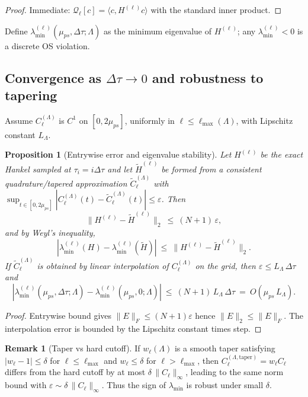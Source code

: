 \documentclass[10pt]{article}
\theoremstyle{definition}
\newtheorem{remark}{Remark}[section]
\theoremstyle{plain}
\newtheorem{proposition}{Proposition}[section]
\begin{document}
\begin{proof}
Immediate: $\mathcal Q_\ell[c]=\langle c, H^{(\ell)} c\rangle$ with the standard inner product.
\end{proof}

Define $\lambda_{\min}^{(\ell)}(\mu_{ps},\Delta\tau;\Lambda)$ as the minimum eigenvalue of $H^{(\ell)}$; any $\lambda_{\min}^{(\ell)}<0$ is a discrete OS violation.

\subsection{\texorpdfstring{Convergence as $\Delta\tau\to 0$ and robustness to tapering}{Convergence as Delta tau -> 0 and robustness to tapering}}\label{subsec:uom-main-009}
Assume $C_\ell^{(\Lambda)}$ is $C^1$ on $[0,2\mu_{ps}]$, uniformly in $\ell\le \ell_{\max}(\Lambda)$, with Lipschitz constant $L_\Lambda$.

\begin{proposition}[Entrywise error and eigenvalue stability]\label{prop:OS-stability}
Let $H^{(\ell)}$ be the exact Hankel sampled at $\tau_i=i\Delta\tau$ and let $\widetilde H^{(\ell)}$ be formed from a consistent quadrature/tapered approximation $\widetilde C_\ell^{(\Lambda)}$ with $\sup_{t\in[0,2\mu_{ps}]}|C_\ell^{(\Lambda)}(t)-\widetilde C_\ell^{(\Lambda)}(t)|\le \varepsilon$. Then
\[
\|H^{(\ell)}-\widetilde H^{(\ell)}\|_2 \ \le\ (N+1)\,\varepsilon,
\]
and by Weyl’s inequality,
\[
\left|\lambda_{\min}^{(\ell)}(H)-\lambda_{\min}^{(\ell)}(\widetilde H)\right|\ \le\ \|H^{(\ell)}-\widetilde H^{(\ell)}\|_2.
\]
If $\widetilde C_\ell^{(\Lambda)}$ is obtained by linear interpolation of $C_\ell^{(\Lambda)}$ on the grid, then $\varepsilon\le L_\Lambda\,\Delta\tau$ and
\[
\left|\lambda_{\min}^{(\ell)}(\mu_{ps},\Delta\tau;\Lambda)-\lambda_{\min}^{(\ell)}(\mu_{ps},0;\Lambda)\right|
\ \le\ (N+1)\,L_\Lambda\,\Delta\tau \ =\ O(\mu_{ps}\,L_\Lambda).
\]
\end{proposition}

\begin{proof}
Entrywise bound gives $\|E\|_F\le (N+1)\varepsilon$ hence $\|E\|_2\le \|E\|_F$. The interpolation error is bounded by the Lipschitz constant times step.
\end{proof}

\begin{remark}[Taper vs hard cutoff]
\label{rem:uom-main-011}
If $w_\ell(\Lambda)$ is a smooth taper satisfying $|w_\ell-1|\le \delta$ for $\ell\le \ell_{\max}$ and $w_\ell\le \delta$ for $\ell>\ell_{\max}$, then
$C_\ell^{(\Lambda,\mathrm{taper})}=w_\ell C_\ell$ differs from the hard cutoff by at most $\delta \,\|C_\ell\|_\infty$, leading to the same norm bound with $\varepsilon\sim \delta \,\|C_\ell\|_\infty$. Thus the sign of $\lambda_{\min}$ is robust under small $\delta$.
\end{remark}
\end{document}
